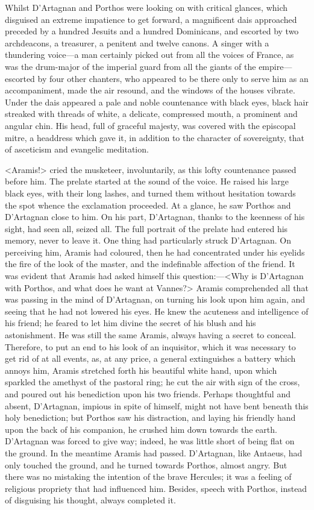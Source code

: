 Whilst D'Artagnan and Porthos were looking on with critical glances, which disguised an extreme impatience to get forward, a magnificent dais approached preceded by a hundred Jesuits and a hundred Dominicans, and escorted by two archdeacons, a treasurer, a penitent and twelve canons. A singer with a thundering voice—a man certainly picked out from all the voices of France, as was the drum-major of the imperial guard from all the giants of the empire—escorted by four other chanters, who appeared to be there only to serve him as an accompaniment, made the air resound, and the windows of the houses vibrate. Under the dais appeared a pale and noble countenance with black eyes, black hair streaked with threads of white, a delicate, compressed mouth, a prominent and angular chin. His head, full of graceful majesty, was covered with the episcopal mitre, a headdress which gave it, in addition to the character of sovereignty, that of asceticism and evangelic meditation.

<Aramis!> cried the musketeer, involuntarily, as this lofty countenance passed before him. The prelate started at the sound of the voice. He raised his large black eyes, with their long lashes, and turned them without hesitation towards the spot whence the exclamation proceeded. At a glance, he saw Porthos and D'Artagnan close to him. On his part, D'Artagnan, thanks to the keenness of his sight, had seen all, seized all. The full portrait of the prelate had entered his memory, never to leave it. One thing had particularly struck D'Artagnan. On perceiving him, Aramis had coloured, then he had concentrated under his eyelids the fire of the look of the master, and the indefinable affection of the friend. It was evident that Aramis had asked himself this question:—<Why is D'Artagnan with Porthos, and what does he want at Vannes?> Aramis comprehended all that was passing in the mind of D'Artagnan, on turning his look upon him again, and seeing that he had not lowered his eyes. He knew the acuteness and intelligence of his friend; he feared to let him divine the secret of his blush and his astonishment. He was still the same Aramis, always having a secret to conceal. Therefore, to put an end to his look of an inquisitor, which it was necessary to get rid of at all events, as, at any price, a general extinguishes a battery which annoys him, Aramis stretched forth his beautiful white hand, upon which sparkled the amethyst of the pastoral ring; he cut the air with sign of the cross, and poured out his benediction upon his two friends. Perhaps thoughtful and absent, D'Artagnan, impious in spite of himself, might not have bent beneath this holy benediction; but Porthos saw his distraction, and laying his friendly hand upon the back of his companion, he crushed him down towards the earth. D'Artagnan was forced to give way; indeed, he was little short of being flat on the ground. In the meantime Aramis had passed. D'Artagnan, like Antaeus, had only touched the ground, and he turned towards Porthos, almost angry. But there was no mistaking the intention of the brave Hercules; it was a feeling of religious propriety that had influenced him. Besides, speech with Porthos, instead of disguising his thought, always completed it.

